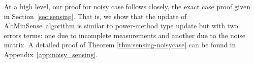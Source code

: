 \documentclass[11pt]{article}
\renewcommand{\eqref}[1]{\hyperref[#1]{(\ref*{#1})}}
\theoremstyle{plain}
\newtheorem{theorem}{Theorem}[section]
\theoremstyle{definition}
\newcommand{\rmn}{\mathbb{R}^{m \times n}}
\newcommand{\dist}{\mathrm{dist}}
\newcommand{\calA}{\mathcal{A}}
\newcommand{\aff}{{\mathcal A}}
\newcommand{\Un}{U^N}
\newcommand{\Vn}{V^N}
\newcommand{\Sn}{\Sigma^N}
\newcommand{\so}{\sigma^*}
\newcommand{\as}{AltMinSense\ }
\begin{document}
At a high level, our proof for noisy case follows closely, the exact case proof given in Section~\ref{sec:sensing}. That is, we show that the update of \as algorithm is similar to power-method type update but with two errors terms: one due to incomplete measurements and another due to the noise matrix. A detailed proof of Theorem \ref{thm:sensing-noisycase} can be found in Appendix~\ref{app:noisy_sensing}.%
\end{document}
